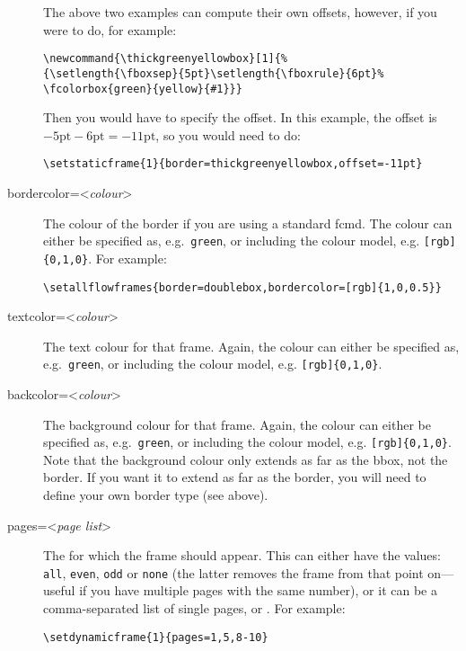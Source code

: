 \documentclass[a4paper,twoside]{book}
\newcommand{\meta}[1]{\textnormal{\textless\textit{#1}\textgreater}}
\newcommand{\key}[1]{#1\index{frame settings!#1}}
\newcounter{N}
\newcounter{I}
\begin{document}
\begin{description}
The above two examples can compute their own offsets, however,
if you were to do, for example:
\begin{verbatim}
\newcommand{\thickgreenyellowbox}[1]{%
{\setlength{\fboxsep}{5pt}\setlength{\fboxrule}{6pt}%
\fcolorbox{green}{yellow}{#1}}}
\end{verbatim}
Then you would have to specify the offset.  In this example,
the offset is $-5\mathrm{pt}-\mathrm{6pt}=-11\mathrm{pt}$,
so you would need to do:
\begin{verbatim}
\setstaticframe{1}{border=thickgreenyellowbox,offset=-11pt}
\end{verbatim}

\item[\key{bordercolor}=\meta{colour}] The colour of the border
if you are using a standard \gls{fcmd}.
The colour can either be specified as, e.g.\ \texttt{green},
or including the colour model, e.g. \verb/[rgb]{0,1,0}/.
For example:
\begin{verbatim}
\setallflowframes{border=doublebox,bordercolor=[rgb]{1,0,0.5}}
\end{verbatim}

\item[\key{textcolor}=\meta{colour}] The text colour for that 
\gls{frame}. Again, the colour can either be specified as, 
e.g.\ \texttt{green}, or including the colour model, 
e.g. \verb/[rgb]{0,1,0}/.

\item[\key{backcolor}=\meta{colour}] The background colour for 
that \gls{frame}. Again, the colour can either be specified as, 
e.g.\ \texttt{green}, or including the colour model, 
e.g. \verb/[rgb]{0,1,0}/. Note that the background colour
only extends as far as the \gls{bbox}, not the border.
If you want it to extend as far as the border, you
will need to define your own border type (see above).

\item[\key{pages}=\meta{page list}] The  for which the \gls{frame}
should appear. This can either have the values: \texttt{all},
\texttt{even}, \texttt{odd} or \texttt{none} (the latter 
removes the \gls{frame} from that point on---useful if you
have multiple pages with the same number), or it can be a 
comma-separated list of single pages, or 
.
For example:
\begin{verbatim}
\setdynamicframe{1}{pages=1,5,8-10}
\end{verbatim}


\end{description}
\end{document}
